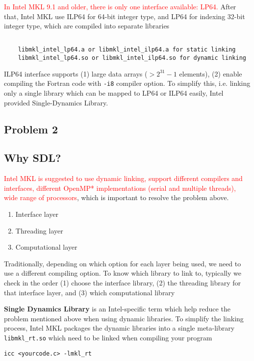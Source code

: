 \textcolor{red}{In Intel MKL 9.1 and older, there is only one interface
available: LP64.} After that, Intel MKL use ILP64 for 64-bit integer type, and
LP64 for indexing 32-bit integer type, which are compiled into separate libraries
\begin{verbatim}

    libmkl_intel_lp64.a or libmkl_intel_ilp64.a for static linking
    libmkl_intel_lp64.so or libmkl_intel_ilp64.so for dynamic linking

\end{verbatim}
ILP64 interface supports (1) large data arrays ($> 2^{31}-1$ elements), (2)
enable compiling the Fortran code with \verb!-i8! compiler option. To simplify
this, i.e. linking only a single library which can be mapped to LP64 or ILP64
easily, Intel provided Single-Dynamics Library.

\subsection{Problem 2}


\subsection{Why SDL?}

\textcolor{red}{Intel MKL is suggested to use dynamic linking, support different
compilers and interfaces, different OpenMP* implementations (serial and multiple
threads), wide range of processors}, which is important to resolve the problem
above.
\begin{enumerate}
  \item Interface layer
  \item Threading layer
  \item Computational layer
\end{enumerate}
Traditionally, depending on which option for each layer being used, we need to
use a different compiling option. To know which library to link to, typically
we check in the order (1) choose the interface library, (2) the threading
library for that interface layer, and (3) which computational library

{\bf Single Dynamics Library} is an Intel-specific term which help reduce the
problem mentioned above when using dynamic libraries. To simplify the linking
process, Intel MKL packages the dynamic libraries into a single meta-library
\verb!libmkl_rt.so! which need to be linked when compiling your program

\begin{verbatim}
icc <yourcode.c> -lmkl_rt
\end{verbatim}

